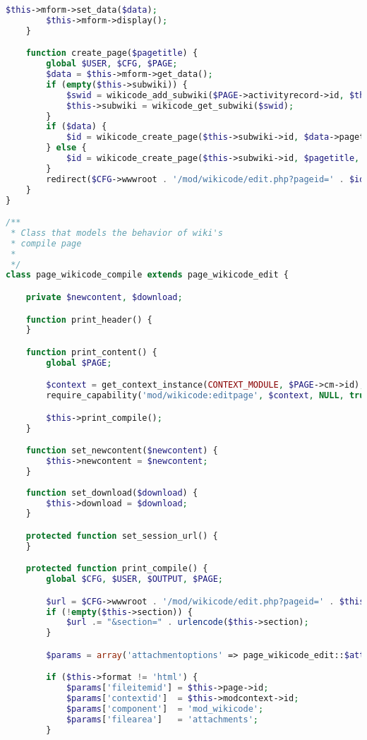 \begin{lstlisting}[language=PHP]
        $this->mform->set_data($data);
        $this->mform->display();
    }

    function create_page($pagetitle) {
        global $USER, $CFG, $PAGE;
        $data = $this->mform->get_data();
        if (empty($this->subwiki)) {
            $swid = wikicode_add_subwiki($PAGE->activityrecord->id, $this->gid, $this->uid);
            $this->subwiki = wikicode_get_subwiki($swid);
        }
        if ($data) {
            $id = wikicode_create_page($this->subwiki->id, $data->pagetitle, $data->pageformat, $USER->id);
        } else {
            $id = wikicode_create_page($this->subwiki->id, $pagetitle, $PAGE->activityrecord->defaultformat, $USER->id);
        }
        redirect($CFG->wwwroot . '/mod/wikicode/edit.php?pageid=' . $id);
    }
}

/**
 * Class that models the behavior of wiki's
 * compile page
 *
 */
class page_wikicode_compile extends page_wikicode_edit {

    private $newcontent, $download;

    function print_header() {
    }

    function print_content() {
        global $PAGE;

        $context = get_context_instance(CONTEXT_MODULE, $PAGE->cm->id);
        require_capability('mod/wikicode:editpage', $context, NULL, true, 'noeditpermission', 'wikicode');

        $this->print_compile();
    }

    function set_newcontent($newcontent) {
        $this->newcontent = $newcontent;
    }
	
	function set_download($download) {
		$this->download = $download;
	}

    protected function set_session_url() {
    }

    protected function print_compile() {
        global $CFG, $USER, $OUTPUT, $PAGE;

        $url = $CFG->wwwroot . '/mod/wikicode/edit.php?pageid=' . $this->page->id;
        if (!empty($this->section)) {
            $url .= "&section=" . urlencode($this->section);
        }

        $params = array('attachmentoptions' => page_wikicode_edit::$attachmentoptions, 'format' => $this->format, 'version' => $this->versionnumber);

        if ($this->format != 'html') {
            $params['fileitemid'] = $this->page->id;
            $params['contextid']  = $this->modcontext->id;
            $params['component']  = 'mod_wikicode';
            $params['filearea']   = 'attachments';
        }


\end{lstlisting}
